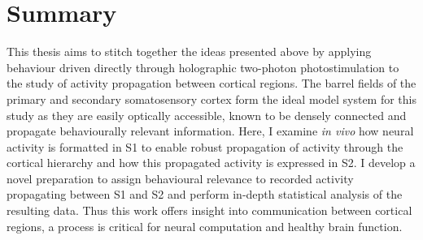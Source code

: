 \section{Summary}

This thesis aims to stitch together the ideas presented above by applying behaviour driven directly through holographic two-photon photostimulation to the study of activity propagation between cortical regions. The barrel fields of the primary and secondary somatosensory cortex form the ideal model system for this study as they are easily optically accessible, known to be densely connected and propagate behaviourally relevant information. Here, I examine \textit{in vivo} how neural activity is formatted in S1 to enable robust propagation of activity through the cortical hierarchy and how this propagated activity is expressed in S2. I develop a novel preparation to assign behavioural relevance to recorded activity propagating between S1 and S2 and perform in-depth statistical analysis of the resulting data. Thus this work offers insight into communication between cortical regions, a process is critical for neural computation and healthy brain function.